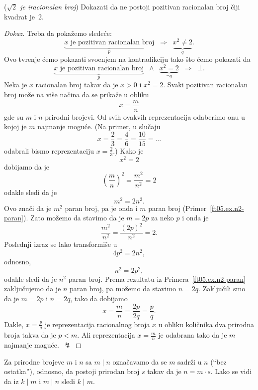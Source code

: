 \begin{EX} (\emph{$\sqrt 2$ je iracionalan broj})
  Dokazati da ne postoji pozitivan racionalan broj \v ciji kvadrat je~2.
\end{EX}
\begin{proof}[Dokaz]
  Treba da poka\v zemo slede\'ce:
  $$
    \underbrace{x \text{\ \ je pozitivan racionalan broj}}_p
    \;\;\Rightarrow\;\;
    \underbrace{x^2 \ne 2}_q.
  $$
  Ovo tvr\dj enje \'cemo pokazati svo\dj enjem na kontradikciju tako \v sto \'cemo pokazati da
  $$
    \underbrace{x \text{\ \ je pozitivan racionalan broj}}_p \;\;\land\;\; \underbrace{x^2 = 2}_{\lnot q}
    \;\;\Rightarrow\;\; \bot.
  $$
  Neka je $x$ racionalan broj takav da je $x > 0$ i $x^2 = 2$. Svaki pozitivan racionalan broj mo\v ze
  na vi\v se na\v cina da se prika\v ze u obliku
  $$
    x = \frac mn
  $$
  gde su $m$ i $n$ prirodni brojevi. Od svih ovakvih reprezentacija odaberimo onu u kojoj je $m$ najmanje mogu\'ce.
  (Na primer, u slu\v caju
  $$
    x = \frac{2}{3} = \frac{4}{6} = \frac{10}{15} = \ldots
  $$
  odabrali bismo reprezentaciju $x = \frac{2}{3}$.) Kako je
  $$
    x^2 = 2
  $$
  dobijamo da je
  $$
    \left(\frac mn\right)^2 = \frac{m^2}{n^2} = 2
  $$
  odakle sledi da je
  $$
    m^2 = 2n^2.
  $$
  Ovo zna\v ci da je $m^2$ paran broj, pa je onda i $m$ paran broj (Primer~\ref{ft05.ex.n2-paran}). Zato mo\v zemo da stavimo
  da je $m = 2p$ za neko $p$ i onda je
  $$
    \frac{m^2}{n^2} = \frac{(2p)^2}{n^2} = 2.
  $$
  Poslednji izraz se lako transformi\v se u
  $$
    4p^2 = 2n^2,
  $$
  odnosno,
  $$
    n^2 = 2p^2,
  $$
  odakle sledi da je $n^2$ paran broj. Prema rezultatu iz Primera~\ref{ft05.ex.n2-paran} zaklju\v cujemo da je $n$ paran broj, pa mo\v zemo
  da stavimo $n = 2q$. Zaklju\v cili smo da je $m = 2p$ i $n = 2q$, tako da dobijamo
  $$
    x = \frac{m}{n} = \frac{2p}{2q} = \frac{p}{q}.
  $$
  Dakle, $x = \frac{p}{q}$ je reprezentacija racionalnog broja $x$ u obliku koli\v cnika dva prirodna broja takva da je $p < m$.
  Ali reprezentacija $x = \frac{m}{n}$ je odabrana tako da je $m$ najmanje magu\'ce.~$\lightning$
\end{proof}

Za prirodne brojeve $m$ i $n$
sa $m \mid n$ ozna\v cavamo da se $m$ sadr\v zi u $n$ (``bez ostatka''), odnosno, da postoji prirodan broj
$s$ takav da je $n = m \cdot s$. Lako se vidi da iz $k \mid m$ i $m \mid n$ sledi $k \mid m$.

